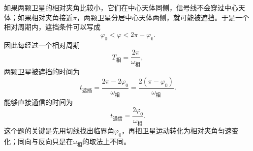 \begin{casetypebox}[title={\strut\textcolor{white}{\bfseries 常见题型：卫星信号遮挡问题}}]
  如果两颗卫星的相对夹角比较小，它们在中心天体同侧，信号线不会穿过中心天体；如果相对夹角接近$\pi$，两颗卫星分居中心天体两侧，就可能被遮挡。于是一个相对周期内，遮挡条件可以写成
  \[
    \varphi_0<\varphi<2\pi-\varphi_0.
  \]
  因此每经过一个相对周期
  \[
    T_{\text{相}}=\frac{2\pi}{\omega_{\text{相}}},
  \]
  两颗卫星被遮挡的时间为
  \[
    t_{\text{遮挡}}
    =\frac{2\pi-2\varphi_0}{\omega_{\text{相}}}
    =\frac{2(\pi-\varphi_0)}{\omega_{\text{相}}}.
  \]
  能够直接通信的时间为
  \[
    t_{\text{通信}}
    =\frac{2\varphi_0}{\omega_{\text{相}}}.
  \]
  这个题的关键是先用切线找出临界角$\varphi_0$，再把卫星运动转化为相对夹角匀速变化；同向与反向只是在$\omega_{\text{相}}$的取法上不同。
\end{casetypebox}

